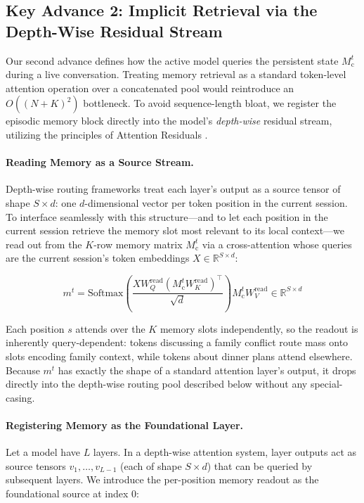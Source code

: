 \documentclass[11pt, a4paper]{article}
\begin{document}
\subsection{Key Advance 2: Implicit Retrieval via the Depth-Wise Residual Stream}

Our second advance defines how the active model queries the persistent state $M_{\text{c}}^t$ during a live conversation. Treating memory retrieval as a standard token-level attention operation over a concatenated pool would reintroduce an $O((N+K)^2)$ bottleneck. To avoid sequence-length bloat, we register the episodic memory block directly into the model's \emph{depth-wise} residual stream, utilizing the principles of Attention Residuals \cite{du2026attention}.

\paragraph{Reading Memory as a Source Stream.}
Depth-wise routing frameworks treat each layer's output as a source tensor of shape $S \times d$: one $d$-dimensional vector per token position in the current session. To interface seamlessly with this structure---and to let each position in the current session retrieve the memory slot most relevant to its local context---we read out from the $K$-row memory matrix $M_{\text{c}}^t$ via a cross-attention whose queries are the current session's token embeddings $X \in \mathbb{R}^{S \times d}$:

\begin{equation}
    m^t = \text{Softmax}\!\left(\frac{X W_Q^{\text{read}} (M_{\text{c}}^t W_K^{\text{read}})^\top}{\sqrt{d}}\right) M_{\text{c}}^t W_V^{\text{read}} \in \mathbb{R}^{S \times d}
\end{equation}

Each position $s$ attends over the $K$ memory slots independently, so the readout is inherently query-dependent: tokens discussing a family conflict route mass onto slots encoding family context, while tokens about dinner plans attend elsewhere. Because $m^t$ has exactly the shape of a standard attention layer's output, it drops directly into the depth-wise routing pool described below without any special-casing.

\paragraph{Registering Memory as the Foundational Layer.}
Let a model have $L$ layers. In a depth-wise attention system, layer outputs act as source tensors $v_1, \ldots, v_{L-1}$ (each of shape $S \times d$) that can be queried by subsequent layers. We introduce the per-position memory readout as the foundational source at index 0:
\end{document}
